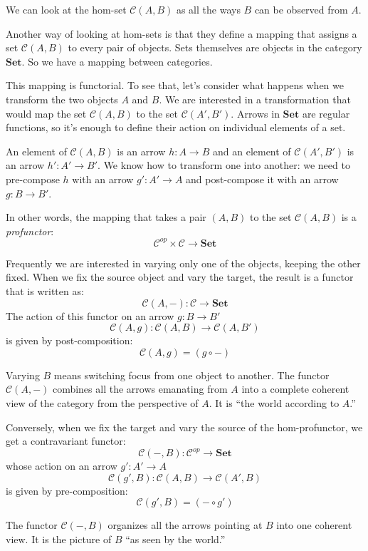 \documentclass[DaoFP]{subfiles}
\begin{document}
We can look at the hom-set $\mathcal{C}(A, B)$ as all the ways $B$ can be observed from $A$. 

Another way of looking at hom-sets is that they define a mapping that assigns a set $\mathcal{C}(A, B)$ to every pair of objects. Sets themselves are objects in the category $\mathbf{Set}$. So we have a mapping between categories.

This mapping is functorial. To see that, let's consider what happens when we transform the two objects $A$ and $B$. We are interested in a transformation that would map the set $\mathcal{C}(A, B)$ to the set $\mathcal{C}(A', B')$. Arrows in $\mathbf{Set}$ are regular functions, so it's enough to define their action on individual elements of a set. 

An element of $\mathcal{C}(A, B)$ is an arrow $h \colon A \to B$ and an element of $\mathcal{C}(A', B')$ is an arrow $h' \colon A' \to B'$. We know how to transform one into another: we need to pre-compose $h$ with an arrow $g' \colon A' \to A$ and post-compose it with an arrow $g \colon B \to B'$. 

In other words, the mapping that takes a pair $(A, B)$ to the set $\mathcal{C}(A, B)$ is a \emph{profunctor}:
\[ \mathcal{C}^{op} \times \mathcal{C} \to \mathbf{Set} \]

Frequently we are interested in varying only one of the objects, keeping the other fixed. When we fix the source object and vary the target, the result is a functor  that is written as:
\[ \mathcal{C}(A, -) \colon \mathcal{C} \to \mathbf{Set} \]
The action of this functor on an arrow $g \colon B \to B'$
\[ \mathcal{C}(A, g) \colon \mathcal{C}(A, B) \to \mathcal{C}(A, B') \]
is given by post-composition:
\[\mathcal{C}(A, g) = (g \circ -) \]

Varying $B$ means switching focus from one object to another. The functor $\mathcal{C}(A, -)$ combines all the arrows emanating from $A$ into a complete coherent view of the category from the perspective of $A$. It is ``the world according to $A$.''

Conversely, when we fix the target and vary the source of the hom-profunctor, we get a contravariant functor:
\[ \mathcal{C}(-, B) \colon \mathcal{C}^{op} \to \mathbf{Set} \]
whose action on an arrow $g' \colon A' \to A$
\[ \mathcal{C}(g', B) \colon \mathcal{C}(A, B) \to \mathcal{C}(A', B) \]
is given by pre-composition:
\[\mathcal{C}(g', B) = (- \circ g') \]

The functor $\mathcal{C}(-, B)$ organizes all the arrows pointing at $B$ into one coherent view. It is the picture of $B$ ``as seen by the world.''
\end{document}

